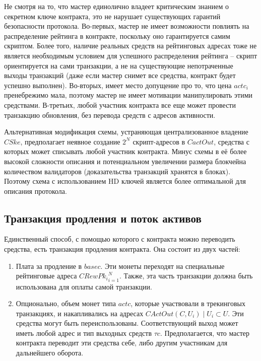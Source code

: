 \documentclass[specification,annotation]{itmo-student-thesis}
\begin{document}
Не смотря на то, что мастер единолично владеет критическим знанием о
секретном ключе контракта, это не нарушает существующих гарантий
безопасности протокола. Во-первых, мастер не имеет возможности
повлиять на распределение рейтинга в контракте, поскольку оно
гарантируется самим скриптом. Более того, наличие реальных средств на
рейтинговых адресах тоже не является необходимым условием для
успешного распределения рейтинга -- скрипт ориентируется на сами
транзакции, а не на существующие непотраченные выходы транзакций (даже
если мастер снимет все средства, контракт будет успешно
выполнен). Во-вторых, имеет место допущение про то, что цена $actc_i$
пренебрежимо мала, поэтому мастер не имеет мотивации манипулировать
этими средствами. В-третьих, любой участник контракта все еще может
провести транзакцию обновления, без перевода средств с адресов
активности.

Альтернативная модификация схемы, устраняющая централизованное
владение $CSke$, предполагает неявное создание $2^N$ скрипт-адресов в
$CactOut$, средства с которых может списывать любой участник
контракта. Минус схемы в её более высокой сложности описания и
потенциальном увеличении размера блокчейна количеством валидаторов
(доказательства транзакций хранятся в блоках). Поэтому схема с
использованием HD ключей является более оптимальной для описания
протокола.

\subsection{Транзакция продления и поток активов}

Единственный способ, с помощью которого с контракта можно переводить
средства, есть транзакция продления контракта. Она состоит из двух
частей:

\begin{enumerate}
\item Плата за продление в $basec$. Эти монеты переходят на
  специальные рейтинговые адреса ${CRewPk_i}_{i=1}^N$. Также, эта часть
  транзакции должна быть использована для оплаты самой транзакции.
\item Опционально, объем монет типа $actc$, которые участвовали в
  трекинговых транзакциях, и накапливались на адресах
  $CActOut(C,U_i) \mid U_i \subset U$. Эти средства могут быть
  переиспользованы. Соответствующий выход может иметь любой адрес и
  тип выходных средств $\tau c$. Предполагается, что мастер контракта
  переводит эти средства себе, либо другим участникам для дальнейшего
  оборота.
\end{enumerate}
\end{document}

